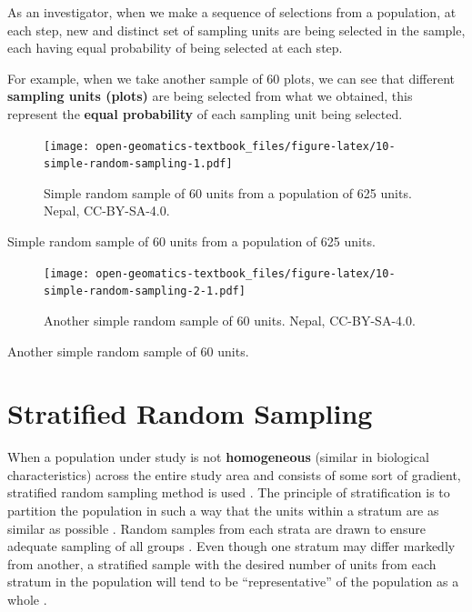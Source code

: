 \documentclass[
]{book}
\begin{document}
As an investigator, when we make a sequence of selections from a population, at each step, new and distinct set of sampling units are being selected in the sample, each having equal probability of being selected at each step.

For example, when we take another sample of 60 plots, we can see that different \textbf{sampling units (plots)} are being selected from what we obtained, this represent the \textbf{equal probability} of each sampling unit being selected.

\begin{figure}
\centering
\texttt{[image: open-geomatics-textbook\_files/figure-latex/10-simple-random-sampling-1.pdf]}
\caption{\label{fig:10-simple-random-sampling}Simple random sample of 60 units from a population of 625 units. Nepal, CC-BY-SA-4.0.}
\end{figure}

Simple random sample of 60 units from a population of 625 units.

\begin{figure}
\centering
\texttt{[image: open-geomatics-textbook\_files/figure-latex/10-simple-random-sampling-2-1.pdf]}
\caption{\label{fig:10-simple-random-sampling-2}Another simple random sample of 60 units. Nepal, CC-BY-SA-4.0.}
\end{figure}

Another simple random sample of 60 units.

\hypertarget{stratified-random-sampling}{%
\section{Stratified Random Sampling}\label{stratified-random-sampling}}

When a population under study is not \textbf{homogeneous} (similar in biological characteristics) across the entire study area and consists of some sort of gradient, stratified random sampling method is used \citep{thompson_sampling_2012}. The principle of stratification is to partition the population in such a way that the units within a stratum are as similar as possible \citep{teddlie_mixed_2007}. Random samples from each strata are drawn to ensure adequate sampling of all groups \citep{teddlie_mixed_2007}. Even though one stratum may differ markedly from another, a stratified sample with the desired number of units from each stratum in the population will tend to be ``representative'' of the population as a whole \citep{howell_area_2020}.
\end{document}
